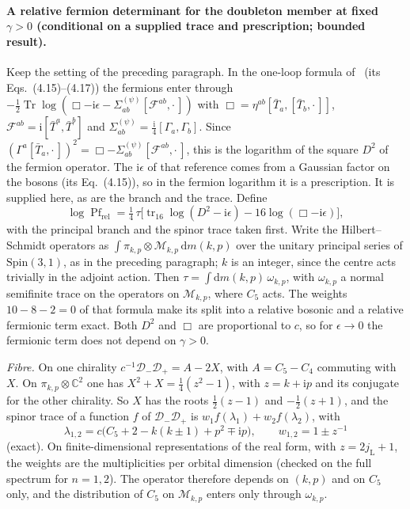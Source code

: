 \paragraph{A relative fermion determinant for the doubleton member at fixed \(\gamma>0\) (conditional on a supplied trace and prescription; bounded result).}
Keep the setting of the preceding paragraph. In the one-loop formula of~\cite{Steinacker2023} (its Eqs.~(4.15)--(4.17)) the fermions enter through \(-\tfrac12\operatorname{Tr}\log(\Box-\mathrm i\epsilon-\Sigma^{(\psi)}_{ab}[\mathcal F^{ab},\cdot\,])\) with \(\Box=\eta^{ab}[\bar T_a,[\bar T_b,\cdot\,]]\), \(\mathcal F^{ab}=\mathrm i[\bar T^a,\bar T^b]\) and \(\Sigma^{(\psi)}_{ab}=\tfrac{\mathrm i}4[\Gamma_a,\Gamma_b]\). Since \((\Gamma^a[\bar T_a,\cdot\,])^2=\Box-\Sigma^{(\psi)}_{ab}[\mathcal F^{ab},\cdot\,]\), this is the logarithm of the square \(D^2\) of the fermion operator. The \(\mathrm i\epsilon\) of that reference comes from a Gaussian factor on the bosons (its Eq.~(4.15)), so in the fermion logarithm it is a prescription. It is supplied here, as are the branch and the trace. Define
\[
\log\operatorname{Pf}_{\mathrm{rel}}=\tfrac14\,\tau\bigl[\operatorname{tr}_{16}\log(D^2-\mathrm i\epsilon)-16\log(\Box-\mathrm i\epsilon)\bigr],
\]
with the principal branch and the spinor trace taken first. Write the Hilbert--Schmidt operators as \(\int\pi_{k,p}\otimes\mathcal M_{k,p}\,\mathrm dm(k,p)\) over the unitary principal series of \(\mathrm{Spin}(3,1)\), as in the preceding paragraph; \(k\) is an integer, since the centre acts trivially in the adjoint action. Then \(\tau=\int\mathrm dm(k,p)\,\omega_{k,p}\), with \(\omega_{k,p}\) a normal semifinite trace on the operators on \(\mathcal M_{k,p}\), where \(C_5\) acts. The weights \(10-8-2=0\) of that formula make its split into a relative bosonic and a relative fermionic term exact. Both \(D^2\) and \(\Box\) are proportional to \(c\), so for \(\epsilon\to0\) the fermionic term does not depend on \(\gamma>0\).

\emph{Fibre.} On one chirality \(c^{-1}\mathcal D_-\mathcal D_+=A-2X\), with \(A=C_5-C_4\) commuting with \(X\). On \(\pi_{k,p}\otimes\mathbb C^2\) one has \(X^2+X=\tfrac14(z^2-1)\), with \(z=k+\mathrm ip\) and its conjugate for the other chirality. So \(X\) has the roots \(\tfrac12(z-1)\) and \(-\tfrac12(z+1)\), and the spinor trace of a function \(f\) of \(\mathcal D_-\mathcal D_+\) is \(w_1f(\lambda_1)+w_2f(\lambda_2)\), with
\[
\lambda_{1,2}=c\bigl(C_5+2-k(k\pm1)+p^2\mp\mathrm ip\bigr),\qquad w_{1,2}=1\pm z^{-1}
\]
(exact). On finite-dimensional representations of the real form, with \(z=2j_{\mathrm L}+1\), the weights are the multiplicities per orbital dimension (checked on the full spectrum for \(n=1,2\)). The operator therefore depends on \((k,p)\) and on \(C_5\) only, and the distribution of \(C_5\) on \(\mathcal M_{k,p}\) enters only through \(\omega_{k,p}\).

